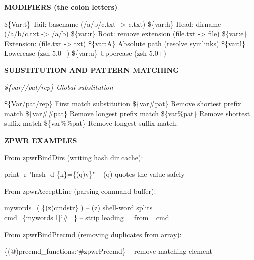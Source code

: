\documentclass[11pt,a4paper,twoside]{book}
\begin{document}
\vspace{12pt}
{\bfseries\color{neonyellow} MODIFIERS (the colon letters)}\vspace{4pt}

\$\{Var:t\}             Tail: basename (/a/b/c.txt -> c.txt) \$\{var:h\}             Head: dirname (/a/b/c.txt -> /a/b) \$\{var:r\}             Root: remove extension (file.txt -> file) \$\{var:e\}             Extension: (file.txt -> txt) \$\{var:A\}             Absolute path (resolve symlinks) \$\{var:l\}             Lowercase (zsh 5.0+) \$\{var:u\}             Uppercase (zsh 5.0+)


\vspace{12pt}
{\bfseries\color{neonyellow} SUBSTITUTION AND PATTERN MATCHING}\vspace{4pt}

{\small\itshape\color{dimtext} \$\{var//pat/rep\}       Global substitution}

\$\{Var/pat/rep\}        First match substitution \$\{var\#pat\}            Remove shortest prefix match \$\{var\#\#pat\}           Remove longest prefix match \$\{var\%pat\}            Remove shortest suffix match \$\{var\%\%pat\}           Remove longest suffix match.


\vspace{12pt}
{\bfseries\color{neonyellow} \textbf{ZPWR} EXAMPLES}\vspace{4pt}

From zpwrBindDirs (writing hash dir cache):

\begin{codebox}
\color{neongreen}print -r "hash -d \{k\}=\{(q)v\}"  -- (q) quotes the value safely\\
\end{codebox}

From zpwrAcceptLine (parsing command buffer):

\begin{codebox}
\color{neongreen}mywords=( \{(z)cmdstr\} )           -- (z) shell-word splits\\
\color{neongreen}cmd=\{mywords[1]{\char`\#}=\}                -- strip leading = from =cmd\\
\end{codebox}

From zpwrBindPrecmd (removing duplicates from array):

\begin{codebox}
\color{neongreen}\{(@)precmd\_functions:{\char`\#}zpwrPrecmd\}  -- remove matching element\\
\end{codebox}
\end{document}
